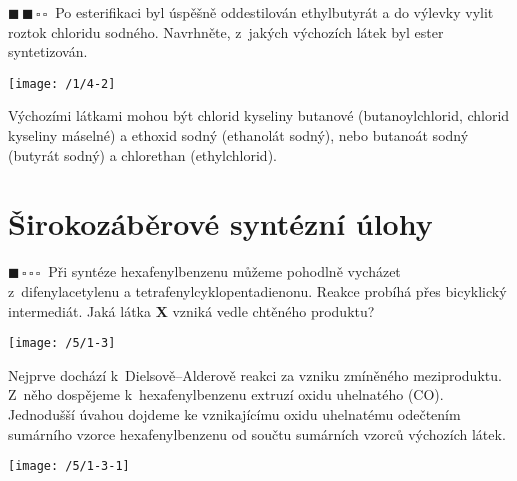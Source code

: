 \documentclass{book}
\newcommand{\jeden}{$\blacksquare \, \square \, \square \, \square \; \; $}
\newcommand{\dva}{$\blacksquare \, \blacksquare \, \square \, \square \; \; $}
\renewenvironment{quotation}{\par}{\par} %
\begin{document}
\newpage %
\begin{quotation}
\dva Po esterifikaci byl úspěšně oddestilován ethylbutyrát a do výlevky
vylit roztok chloridu sodného. Navrhněte, z~jakých výchozích látek
byl ester syntetizován. 
\end{quotation} \dotfill \par 
\begin{center}
\texttt{[image: /1/4-2]}
\end{center}

Výchozími látkami mohou být chlorid kyseliny butanové (butanoylchlorid,
chlorid kyseliny máselné) a ethoxid sodný (ethanolát sodný), nebo
butanoát sodný (butyrát sodný) a chlorethan (ethylchlorid). 

\section{Širokozáběrové syntézní úlohy}

\begin{quotation}
\jeden Při syntéze hexafenylbenzenu můžeme pohodlně vycházet z~difenylacetylenu
a tetrafenylcyklopentadienonu. Reakce probíhá přes bicyklický intermediát.
Jaká látka \textbf{X} vzniká vedle chtěného produktu? 
\begin{center}
\texttt{[image: /5/1-3]} 
\par\end{center}

\end{quotation} \dotfill \par 
Nejprve dochází k~Dielsově--Alderově reakci za vzniku zmíněného
meziproduktu. Z~něho dospějeme k~hexafenylbenzenu extruzí oxidu uhelnatého
(CO). Jednodušší úvahou dojdeme ke vznikajícímu oxidu uhelnatému odečtením
sumárního vzorce hexafenylbenzenu od součtu sumárních vzorců výchozích
látek. 
\begin{center}
\texttt{[image: /5/1-3-1]} 
\par\end{center}
\end{document}
